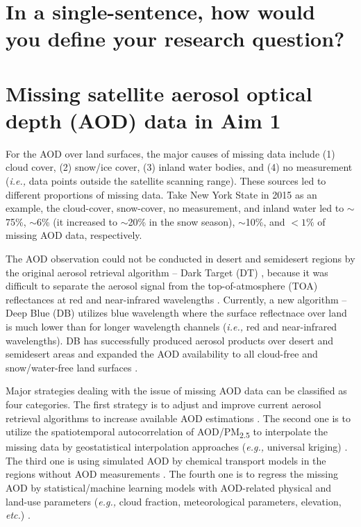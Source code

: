 \documentclass[11pt]{article}
\newcommand{\tsub}{\textsubscript}
\begin{document}
\setcounter{section}{0}

\section{In a single-sentence, how would you define your research question?}

\section{Missing satellite aerosol optical depth (AOD) data in Aim 1}
\begin{enumerate*}[{[a)]}]
    \item For the AOD over land surfaces, the major causes of missing data include (1) cloud cover, (2) snow/ice cover, (3) inland water bodies, and (4) no measurement (\textit{i.e.,} data points outside the satellite scanning range). These sources led to different proportions of missing data. Take New York State in 2015 as an example, the cloud-cover, snow-cover, no measurement, and inland water led to $\sim$75\%, $\sim$6\% (it increased to $\sim$20\% in the snow season), $\sim$10\%, and $< 1\%$ of missing AOD data, respectively. 
    
    The AOD observation could not be conducted in desert and semidesert regions by the original aerosol retrieval algorithm -- Dark Target (DT) \citep{kaufman1997modis, levy2007second}, because it was difficult to separate the aerosol signal from the top-of-atmosphere (TOA) reflectances at red and near-infrared wavelengths \citep{hsu2013enhanced}. Currently, a new algorithm -- Deep Blue (DB) \citep{hsu2004aerosol} utilizes blue wavelength where the surface reflectnace over land is much lower than for longer wavelength channels (\textit{i.e.,} red and near-infrared wavelengths). DB has successfully produced aerosol products over desert and semidesert areas and expanded the AOD availability to all cloud-free and snow/water-free land surfaces \citep{hsu2013enhanced}. 
    
    Major strategies dealing with the issue of missing AOD data can be classified as four categories. The first strategy is to adjust and improve current aerosol retrieval algorithms to increase available AOD estimations \citep{van2011satellite}. The second one is to utilize the spatiotemporal autocorrelation of AOD/PM\tsub{2.5} to interpolate the missing data by geostatistical interpolation approaches (\textit{e.g.,} universal kriging) \citep{kloog2011assessing, kloog2012incorporating}. The third one is using simulated AOD by chemical transport models in the regions without AOD measurements \citep{hu2017estimating}. The fourth one is to regress the missing AOD by statistical/machine learning models with AOD-related physical and land-use parameters (\textit{e.g.,} cloud fraction, meteorological parameters, elevation, \textit{etc.}) \citep{xiao2017full}.
    

\end{enumerate*}
\end{document}
